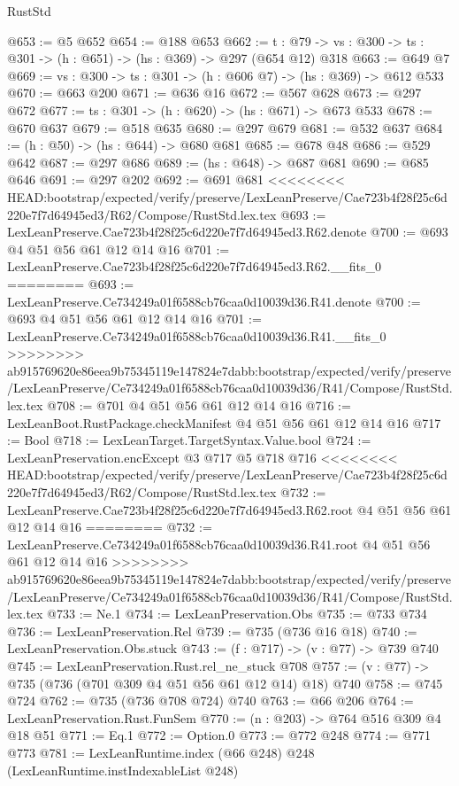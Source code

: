 \begin{lexlean}{RustStd}
\begin{coremodule}
{\begin{coremodule}
@653 := @5 @652
@654 := @188 @653
@662 := {t : @79} -> {vs : @300} -> {ts : @301} -> (h : @651) -> (hs : @369) -> @297 (@654 @12) @318
@663 := @649 @7
@669 := {vs : @300} -> {ts : @301} -> (h : @606 @7) -> (hs : @369) -> @612 @533
@670 := @663 @200
@671 := @636 @16
@672 := @567 @628
@673 := @297 @672
@677 := {ts : @301} -> (h : @620) -> (hs : @671) -> @673 @533
@678 := @670 @637
@679 := @518 @635
@680 := @297 @679
@681 := @532 @637
@684 := (h : @50) -> (hs : @644) -> @680 @681
@685 := @678 @48
@686 := @529 @642
@687 := @297 @686
@689 := (hs : @648) -> @687 @681
@690 := @685 @646
@691 := @297 @202
@692 := @691 @681
<<<<<<<< HEAD:bootstrap/expected/verify/preserve/LexLeanPreserve/Cae723b4f28f25c6d220e7f7d64945ed3/R62/Compose/RustStd.lex.tex
@693 := LexLeanPreserve.Cae723b4f28f25c6d220e7f7d64945ed3.R62.denote
@700 := @693 @4 @51 @56 @61 @12 @14 @16
@701 := LexLeanPreserve.Cae723b4f28f25c6d220e7f7d64945ed3.R62.__fits_0
========
@693 := LexLeanPreserve.Ce734249a01f6588cb76caa0d10039d36.R41.denote
@700 := @693 @4 @51 @56 @61 @12 @14 @16
@701 := LexLeanPreserve.Ce734249a01f6588cb76caa0d10039d36.R41.__fits_0
>>>>>>>> ab915769620e86eea9b75345119e147824e7dabb:bootstrap/expected/verify/preserve/LexLeanPreserve/Ce734249a01f6588cb76caa0d10039d36/R41/Compose/RustStd.lex.tex
@708 := @701 @4 @51 @56 @61 @12 @14 @16
@716 := LexLeanBoot.RustPackage.checkManifest @4 @51 @56 @61 @12 @14 @16
@717 := Bool
@718 := LexLeanTarget.TargetSyntax.Value.bool
@724 := LexLeanPreservation.encExcept @3 @717 @5 @718 @716
<<<<<<<< HEAD:bootstrap/expected/verify/preserve/LexLeanPreserve/Cae723b4f28f25c6d220e7f7d64945ed3/R62/Compose/RustStd.lex.tex
@732 := LexLeanPreserve.Cae723b4f28f25c6d220e7f7d64945ed3.R62.root @4 @51 @56 @61 @12 @14 @16
========
@732 := LexLeanPreserve.Ce734249a01f6588cb76caa0d10039d36.R41.root @4 @51 @56 @61 @12 @14 @16
>>>>>>>> ab915769620e86eea9b75345119e147824e7dabb:bootstrap/expected/verify/preserve/LexLeanPreserve/Ce734249a01f6588cb76caa0d10039d36/R41/Compose/RustStd.lex.tex
@733 := Ne.{1}
@734 := LexLeanPreservation.Obs
@735 := @733 @734
@736 := LexLeanPreservation.Rel
@739 := @735 (@736 @16 @18)
@740 := LexLeanPreservation.Obs.stuck
@743 := (f : @717) -> (v : @77) -> @739 @740
@745 := LexLeanPreservation.Rust.rel_ne_stuck @708
@757 := (v : @77) -> @735 (@736 (@701 @309 @4 @51 @56 @61 @12 @14) @18) @740
@758 := @745 @724
@762 := @735 (@736 @708 @724) @740
@763 := @66 @206
@764 := LexLeanPreservation.Rust.FunSem
@770 := (n : @203) -> @764 @516 @309 @4 @18 @51
@771 := Eq.{1}
@772 := Option.{0}
@773 := @772 @248
@774 := @771 @773
@781 := LexLeanRuntime.index (@66 @248) @248 (LexLeanRuntime.instIndexableList @248)

\end{coremodule}}
\end{coremodule}
\end{lexlean}
